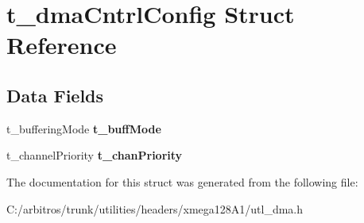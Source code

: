 \hypertarget{structt__dma_cntrl_config}{\section{t\-\_\-dma\-Cntrl\-Config Struct Reference}
\label{structt__dma_cntrl_config}
}
\subsection*{Data Fields}
\begin{DoxyCompactItemize}
\item 
\hypertarget{structt__dma_cntrl_config_a6d28c0c8029ba20c03d1d18e342f232a}{t\-\_\-buffering\-Mode {\bfseries t\-\_\-buff\-Mode}}\label{structt__dma_cntrl_config_a6d28c0c8029ba20c03d1d18e342f232a}

\item 
\hypertarget{structt__dma_cntrl_config_a03ac38f580e000c45c24bf781c8b88dc}{t\-\_\-channel\-Priority {\bfseries t\-\_\-chan\-Priority}}\label{structt__dma_cntrl_config_a03ac38f580e000c45c24bf781c8b88dc}

\end{DoxyCompactItemize}


The documentation for this struct was generated from the following file\-:\begin{DoxyCompactItemize}
\item 
C\-:/arbitros/trunk/utilities/headers/xmega128\-A1/utl\-\_\-dma.\-h\end{DoxyCompactItemize}
